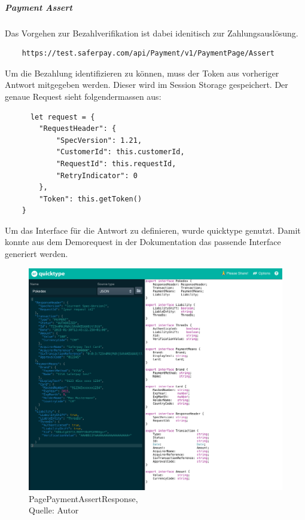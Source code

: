 \subparagraph{Payment Assert}
Das Vorgehen zur Bezahlverifikation ist dabei idenitisch zur Zahlungsauslösung. 
\begin{verbatim}
	https://test.saferpay.com/api/Payment/v1/PaymentPage/Assert
\end{verbatim}
Um die Bezahlung identifizieren zu können, muss der Token aus vorheriger Antwort mitgegeben werden. Dieser wird im Session Storage gespeichert. 
Der genaue Request sieht folgendermassen aus: 
\begin{verbatim}
	  let request = {
		"RequestHeader": {
			"SpecVersion": 1.21,
			"CustomerId": this.customerId,
			"RequestId": this.requestId,
			"RetryIndicator": 0
		},
		"Token": this.getToken()
	}
\end{verbatim}
Um das Interface für die Antwort zu definieren, wurde quicktype genutzt. Damit konnte aus dem Demorequest in der Dokumentation das passende Interface generiert werden. 
\begin{figure}[H]
	\centering
	\includegraphics[width=1\textwidth]{images/quickType.PNG}
	\caption[PagePaymentAssertResponse]{PagePaymentAssertResponse,\\ Quelle: Autor}
	\label{img: PagePaymentAssertResponse}
\end{figure} 

